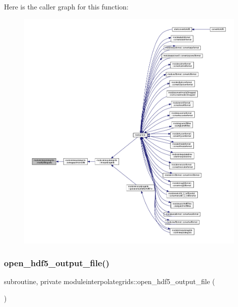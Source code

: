 Here is the caller graph for this function\+:\nopagebreak
\begin{figure}[H]
\begin{center}
\leavevmode
\includegraphics[width=350pt]{namespacemoduleinterpolategrids_aef67e9e027ab07c151745060a6b0e649_icgraph}
\end{center}
\end{figure}
\mbox{\label{namespacemoduleinterpolategrids_adb5ceaa8539e3f7a80b1968dfc2bb3f7}} 
\subsubsection{\texorpdfstring{open\+\_\+hdf5\+\_\+output\+\_\+file()}{open\_hdf5\_output\_file()}}
{\footnotesize\ttfamily subroutine, private moduleinterpolategrids\+::open\+\_\+hdf5\+\_\+output\+\_\+file (\begin{DoxyParamCaption}{ }\end{DoxyParamCaption})\hspace{0.3cm}{\ttfamily [private]}}

